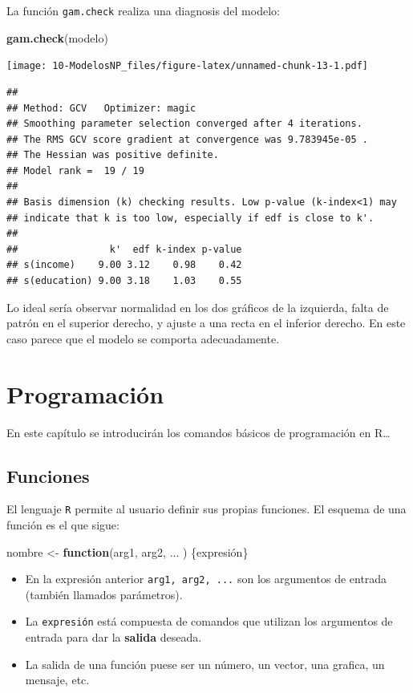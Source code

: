 \documentclass[]{book}
\newenvironment{Shaded}{\begin{snugshade}}{\end{snugshade}}
\newcommand{\KeywordTok}[1]{\textcolor[rgb]{0.13,0.29,0.53}{\textbf{#1}}}
\newcommand{\StringTok}[1]{\textcolor[rgb]{0.31,0.60,0.02}{#1}}
\newcommand{\ControlFlowTok}[1]{\textcolor[rgb]{0.13,0.29,0.53}{\textbf{#1}}}
\newcommand{\NormalTok}[1]{#1}
\begin{document}
La función \texttt{gam.check} realiza una diagnosis del modelo:

\begin{Shaded}
\begin{Highlighting}[]
\KeywordTok{gam.check}\NormalTok{(modelo)}
\end{Highlighting}
\end{Shaded}

\texttt{[image: 10-ModelosNP\_files/figure-latex/unnamed-chunk-13-1.pdf]}

\begin{verbatim}
## 
## Method: GCV   Optimizer: magic
## Smoothing parameter selection converged after 4 iterations.
## The RMS GCV score gradient at convergence was 9.783945e-05 .
## The Hessian was positive definite.
## Model rank =  19 / 19 
## 
## Basis dimension (k) checking results. Low p-value (k-index<1) may
## indicate that k is too low, especially if edf is close to k'.
## 
##                k'  edf k-index p-value
## s(income)    9.00 3.12    0.98    0.42
## s(education) 9.00 3.18    1.03    0.55
\end{verbatim}

Lo ideal sería observar normalidad en los dos gráficos de la izquierda,
falta de patrón en el superior derecho, y ajuste a una recta en el
inferior derecho. En este caso parece que el modelo se comporta
adecuadamente.

\chapter{Programación}\label{programacion}

En este capítulo se introducirán los comandos básicos de programación en
R\ldots{}

\section{Funciones}\label{funciones}

El lenguaje \texttt{R} permite al usuario definir sus propias funciones.
El esquema de una función es el que sigue:

\begin{Shaded}
\begin{Highlighting}[]
\NormalTok{nombre <-}\StringTok{ }\ControlFlowTok{function}\NormalTok{(arg1, arg2, ... ) \{expresión\}}
\end{Highlighting}
\end{Shaded}

\begin{itemize}
\item
  En la expresión anterior \texttt{arg1,\ arg2,\ ...} son los argumentos
  de entrada (también llamados parámetros).
\item
  La \texttt{expresión} está compuesta de comandos que utilizan los
  argumentos de entrada para dar la \textbf{salida} deseada.
\item
  La salida de una función puese ser un número, un vector, una grafica,
  un mensaje, etc.
\end{itemize}
\end{document}

